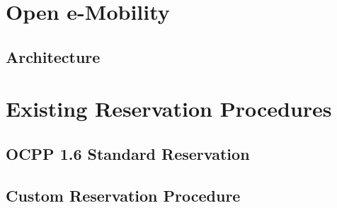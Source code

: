 \section{Open e-Mobility}
\label{ch:Introduction:sec:Open e-Mobility}

\subsection{Architecture}
\label{ch:Introduction:sec:Open e-Mobility:ssec:Architecture}

\section{Existing Reservation Procedures}
\label{ch:Introduction:sec:Existing Reservation Procedures}

\subsection{OCPP 1.6 Standard Reservation}
\label{ch:Introduction:sec:Existing Reservation Procedures:ssec:OCPP 1.6 Standard Reservation}

\subsection{Custom Reservation Procedure}
\label{ch:Introduction:sec:Existing Reservation Procedures:ssec:Custom Reservation Procedure}

